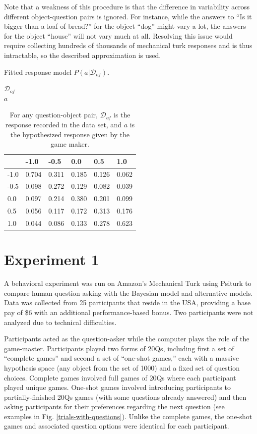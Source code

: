 \documentclass[11pt,letterpaper]{article}
\newcommand{\mc}[1]{\mathcal{#1}}
\begin{document}
Note that a weakness of this procedure is that the difference in variability across different object-question pairs is ignored.
For instance, while the answers to ``Is it bigger than a loaf of bread?'' for the object ``dog'' might vary a lot, the answers for the object ``house'' will not vary much at all.
Resolving this issue would require collecting hundreds of thousands of mechanical turk responses and is thus intractable, so the described approximation is used.

\begin{table}[h]
{\small
\begin{center} 
\caption{Fitted response model $P(a|\mc{D}_{of})$.}
\label{table-likelihood}
$\mc{D}_{of}$
\\
$a$
\begin{tabular}{l|lllll} 
     & -1.0   & -0.5   & 0.0    & 0.5    & 1.0 \\ \hline 
-1.0 & 0.704  & 0.311  & 0.185  & 0.126  & 0.062 \\
-0.5 & 0.098  & 0.272  & 0.129  & 0.082  & 0.039 \\
0.0  & 0.097  & 0.214  & 0.380  & 0.201  & 0.099 \\
0.5  & 0.056  & 0.117  & 0.172  & 0.313  & 0.176 \\
1.0  & 0.044  & 0.086  & 0.133  & 0.278  & 0.623 \\
\end{tabular} 
\caption*{For any question-object pair, $\mc{D}_{of}$ is the response recorded in the data set, and $a$ is the hypothesized response given by the game maker.}
\end{center}}
\end{table}

\section*{Experiment 1}
A behavioral experiment was run on Amazon's Mechanical Turk using Psiturk \cite{Psiturk} to compare human question asking with the Bayesian model and alternative models. 
Data was collected from 25 participants that reside in the USA, providing a base pay of \$6 with an additional performance-based bonus. 
Two participants were not analyzed due to technical difficulties.

Participants acted as the question-asker while the computer plays the role of the game-master. 
Participants played two forms of 20Qs, including first a set of ``complete games'' and second a set of ``one-shot games,'' each with a massive hypothesis space (any object from the set of 1000) and a fixed set of question choices. 
Complete games involved full games of 20Qs where each participant played unique games. One-shot games involved introducing participants to partially-finished 20Qs games (with some questions already answered) and then asking participants for their preferences regarding the next question (see examples in Fig. \ref{trials-with-questions}). 
Unlike the complete games, the one-shot games and associated question options were identical for each participant.
\end{document}
